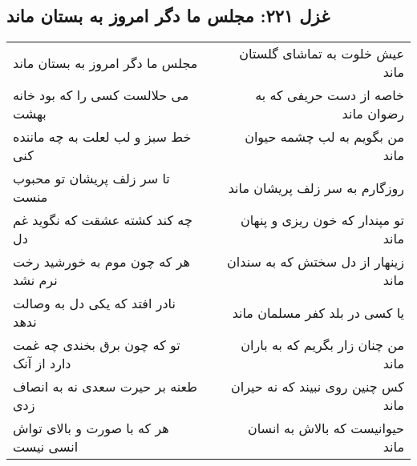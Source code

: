 \begin{center}
\section*{غزل ۲۲۱: مجلس ما دگر امروز به بستان ماند}
\label{sec:221}
\begin{longtable}{l p{0.5cm} r}
مجلس ما دگر امروز به بستان ماند
&&
عیش خلوت به تماشای گلستان ماند
\\
می حلالست کسی را که بود خانه بهشت
&&
خاصه از دست حریفی که به رضوان ماند
\\
خط سبز و لب لعلت به چه ماننده کنی
&&
من بگویم به لب چشمه حیوان ماند
\\
تا سر زلف پریشان تو محبوب منست
&&
روزگارم به سر زلف پریشان ماند
\\
چه کند کشته عشقت که نگوید غم دل
&&
تو مپندار که خون ریزی و پنهان ماند
\\
هر که چون موم به خورشید رخت نرم نشد
&&
زینهار از دل سختش که به سندان ماند
\\
نادر افتد که یکی دل به وصالت ندهد
&&
یا کسی در بلد کفر مسلمان ماند
\\
تو که چون برق بخندی چه غمت دارد از آنک
&&
من چنان زار بگریم که به باران ماند
\\
طعنه بر حیرت سعدی نه به انصاف زدی
&&
کس چنین روی نبیند که نه حیران ماند
\\
هر که با صورت و بالای تواش انسی نیست
&&
حیوانیست که بالاش به انسان ماند
\\
\end{longtable}
\end{center}
